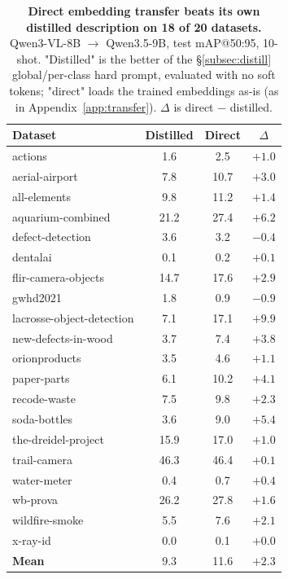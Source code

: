 \documentclass{article}
\newcommand{\qwen}{Qwen3-VL}
\begin{document}
\begin{table}[!ht]
  \centering
  \caption{\textbf{Direct embedding transfer beats its own distilled description on 18 of 20 datasets.}
    \qwen{}-8B $\to$ Qwen3.5-9B, test mAP@50:95, 10-shot. "Distilled" is the better of the \S\ref{subsec:distill} global/per-class hard prompt, evaluated with no soft tokens; "direct" loads the trained embeddings as-is (as in Appendix~\ref{app:transfer}). $\Delta$ is direct $-$ distilled.}
  \label{tab:distill_transfer_full}
  \small
  \setlength{\tabcolsep}{6pt}
  \begin{tabular}{lccc}
    \toprule
    \textbf{Dataset} & \textbf{Distilled} & \textbf{Direct} & $\Delta$ \\
    \midrule
    actions                    &  1.6 &  2.5 & $+1.0$ \\
    aerial-airport             &  7.8 & 10.7 & $+3.0$ \\
    all-elements                &  9.8 & 11.2 & $+1.4$ \\
    aquarium-combined          & 21.2 & 27.4 & $+6.2$ \\
    defect-detection           &  3.6 &  3.2 & $-0.4$ \\
    dentalai                   &  0.1 &  0.2 & $+0.1$ \\
    flir-camera-objects        & 14.7 & 17.6 & $+2.9$ \\
    gwhd2021                   &  1.8 &  0.9 & $-0.9$ \\
    lacrosse-object-detection  &  7.1 & 17.1 & $+9.9$ \\
    new-defects-in-wood        &  3.7 &  7.4 & $+3.8$ \\
    orionproducts               &  3.5 &  4.6 & $+1.1$ \\
    paper-parts                 &  6.1 & 10.2 & $+4.1$ \\
    recode-waste                &  7.5 &  9.8 & $+2.3$ \\
    soda-bottles                &  3.6 &  9.0 & $+5.4$ \\
    the-dreidel-project         & 15.9 & 17.0 & $+1.0$ \\
    trail-camera                & 46.3 & 46.4 & $+0.1$ \\
    water-meter                 &  0.4 &  0.7 & $+0.4$ \\
    wb-prova                    & 26.2 & 27.8 & $+1.6$ \\
    wildfire-smoke               &  5.5 &  7.6 & $+2.1$ \\
    x-ray-id                    &  0.0 &  0.1 & $+0.0$ \\
    \midrule
    \textbf{Mean}                &  9.3 & 11.6 & $+2.3$ \\
    \bottomrule
  \end{tabular}
\end{table}
\end{document}
